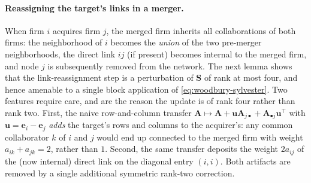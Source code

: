 \paragraph{Reassigning the target's links in a merger.}
When firm $i$ acquires firm $j$, the merged firm inherits all
collaborations of both firms: the neighborhood of $i$ becomes the
\emph{union} of the two pre-merger neighborhoods, the direct link $ij$
(if present) becomes internal to the merged firm, and node $j$ is
subsequently removed from the network. The next lemma shows that the
link-reassignment step is a perturbation of $\mathbf{S}$ of rank at most
four, and hence amenable to a single block application of
\eqref{eq:woodbury-sylvester}. Two features require care, and are the
reason the update is of rank four rather than rank two. First, the naive
row-and-column transfer $\mathbf{A} \mapsto \mathbf{A} + \mathbf{u}
\mathbf{A}_{j \bullet} + \mathbf{A}_{\bullet j} \mathbf{u}^\top$ with
$\mathbf{u} = \mathbf{e}_i - \mathbf{e}_j$ \emph{adds} the target's rows
and columns to the acquirer's: any common collaborator $k$ of $i$ and
$j$ would end up connected to the merged firm with weight $a_{ik} +
a_{jk} = 2$, rather than $1$. Second, the same transfer deposits the
weight $2 a_{ij}$ of the (now internal) direct link on the diagonal
entry $(i,i)$. Both artifacts are removed by a single additional
symmetric rank-two correction.

